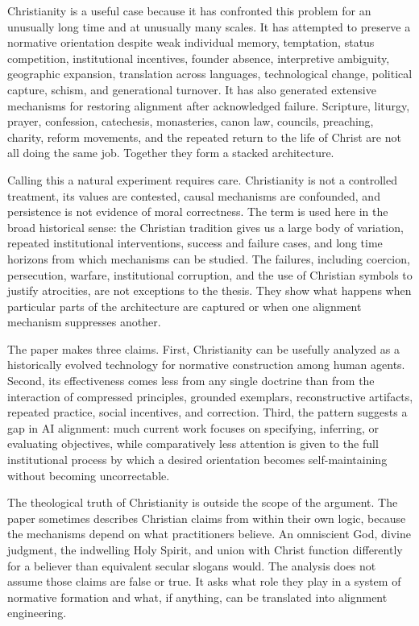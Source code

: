 \documentclass[11pt]{article}
\begin{document}
Christianity is a useful case because it has confronted this problem for an unusually long time and at unusually many scales. It has attempted to preserve a normative orientation despite weak individual memory, temptation, status competition, institutional incentives, founder absence, interpretive ambiguity, geographic expansion, translation across languages, technological change, political capture, schism, and generational turnover. It has also generated extensive mechanisms for restoring alignment after acknowledged failure. Scripture, liturgy, prayer, confession, catechesis, monasteries, canon law, councils, preaching, charity, reform movements, and the repeated return to the life of Christ are not all doing the same job. Together they form a stacked architecture.

Calling this a natural experiment requires care. Christianity is not a controlled treatment, its values are contested, causal mechanisms are confounded, and persistence is not evidence of moral correctness. The term is used here in the broad historical sense: the Christian tradition gives us a large body of variation, repeated institutional interventions, success and failure cases, and long time horizons from which mechanisms can be studied. The failures, including coercion, persecution, warfare, institutional corruption, and the use of Christian symbols to justify atrocities, are not exceptions to the thesis. They show what happens when particular parts of the architecture are captured or when one alignment mechanism suppresses another.

The paper makes three claims. First, Christianity can be usefully analyzed as a historically evolved technology for normative construction among human agents. Second, its effectiveness comes less from any single doctrine than from the interaction of compressed principles, grounded exemplars, reconstructive artifacts, repeated practice, social incentives, and correction. Third, the pattern suggests a gap in AI alignment: much current work focuses on specifying, inferring, or evaluating objectives, while comparatively less attention is given to the full institutional process by which a desired orientation becomes self-maintaining without becoming uncorrectable.

The theological truth of Christianity is outside the scope of the argument. The paper sometimes describes Christian claims from within their own logic, because the mechanisms depend on what practitioners believe. An omniscient God, divine judgment, the indwelling Holy Spirit, and union with Christ function differently for a believer than equivalent secular slogans would. The analysis does not assume those claims are false or true. It asks what role they play in a system of normative formation and what, if anything, can be translated into alignment engineering.
\end{document}
